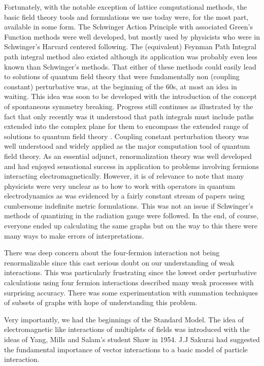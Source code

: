 \documentclass[letterpaper,twoside,preprintnumbers,slac_one]{revtex4}
\begin{document}
Fortunately, with the notable exception of lattice computational
methods, the basic field theory tools and formulations we use today
were, for the most part, available in some form. The Schwinger Action
Principle with associated Green's Function methods were well
developed, but mostly used by physicists who were in Schwinger's
Harvard centered following.  The (equivalent) Feynman Path Integral
path integral method also existed although its application was
probably even less known than Schwinger's methods. That either of
these methods could easily lead to solutions of quantum field theory
that were fundamentally non (coupling constant) perturbative was, at
the beginning of the 60s, at most an idea in waiting. This idea was
soon to be developed with the introduction of the concept of
spontaneous symmetry breaking. Progress still continues as illustrated
by the fact that only recently was it understood that path integrals
must include paths extended into the complex plane for them to
encompass the extended range of solutions to quantum field theory
\cite{ggg;1996,ggzg;2007}. Coupling constant perturbation theory was
well understood and widely applied as the major computation tool of
quantum field theory.  As an essential adjunct, renormalization theory
was well developed and had enjoyed sensational success in application
to problems involving fermions interacting
electromagnetically. However, it is of relevance to note that many
physicists were very unclear as to how to work with operators in
quantum electrodynamics as was evidenced by a fairly constant stream
of papers using cumbersome indefinite metric formulations. This was
not an issue if Schwinger's methods of quantizing in the radiation
gauge were followed. In the end, of course, everyone ended up
calculating the same graphs but on the way to this there were many
ways to make errors of interpretations.

There was deep concern about the four-fermion interaction not being
renormalizable since this cast serious doubt on our understanding of
weak interactions. This was particularly frustrating since the lowest
order perturbative calculations using four fermion interactions
described many weak processes with surprising accuracy. There was some
experimentation with summation techniques of subsets of graphs with
hope of understanding this problem.


Very importantly, we had the beginnings of the Standard Model.
The idea of electromagnetic like interactions of multiplets of fields
was introduced with the ideas of Yang, Mills and Salam's student Shaw
\cite{ym;1954,ss;1955} in 1954.  J.J Sakurai \cite{sak;1960} had
suggested the fundamental importance of vector interactions to a basic
model of particle interaction.
\end{document}
